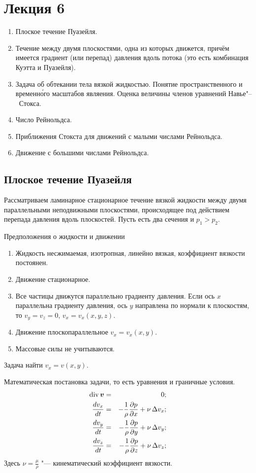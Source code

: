 \section{Лекция 6}
\begin{enumerate}
\item Плоское течение Пуазейля.
\item Течение между двумя плоскостями, одна из которых движется, причём имеется градиент (или перепад) давления вдоль потока (это есть комбинация Куэтта и Пуазейля).
\item Задача об обтекании тела вязкой жидкостью. Понятие пространственного и временн\'{о}го масштабов являения. Оценка величины членов уравнений Навье"--~Стокса.
\item Число Рейнольдса.
\item Приближения Стокста для движений с малыми числами Рейнольдса.
\item Движение с большими числами Рейнольдса.
\end{enumerate}

\subsection{Плоское течение Пуазейля}
Рассматриваем ламинарное стационарное течение вязкой жидкости между двумя параллельными неподвижными плоскостями, происходящее под действием перепада давления вдоль плоскостей.
Пусть есть два сечения и $p_1>p_2$.

Предположения о жидкости и движении
\begin{enumerate}
\item Жидкость несжимаемая, изотропная, линейно вязкая, коэффициент вязкости постоянен.
\item Движение стационарное.
\item Все частицы движутся параллельно градиенту давления. Если ось $x$ параллельна градиенту давления, ось $y$ направлена по нормали к плоскостям, то $v_y=v_z=0$, $v_x=v_x(x,y,z)$.
\item Движение плоскопараллельное $v_x = v_x(x,y)$.
\item Массовые силы не учитываются.
\end{enumerate}

Задача найти $v_x = v(x,y)$.

Математическая постановка задачи, то есть уравнения и граничные условия.
\begin{eqnarray}
\label{Pu1}\operatorname{div}\boldsymbol{v}&=&0;\\
\label{Pu2}\frac{dv_x}{dt} &=& -\frac1\rho\frac{\partial p}{\partial x} + \nu\,\Delta v_x;\\
\label{Pu3}\frac{dv_y}{dt} &=& - \frac1\rho\frac{\partial p}{\partial y} + \nu\,\Delta v_y;\\
\label{Pu4}\frac{dv_z}{dt} &=& - \frac1\rho\frac{\partial p}{\partial z} + \nu\,\Delta v_z;\\
\end{eqnarray}
Здесь $\nu = \frac\mu\rho$ "--- кинематический коэффициент вязкости.

